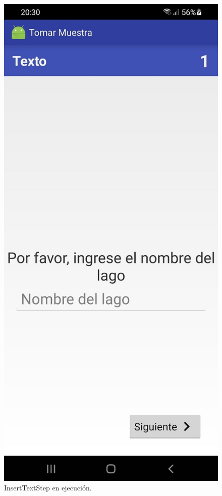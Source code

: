 \begin{figure}[H]
  \centering
    \includegraphics[scale=0.3]{50-anexos/C-steps/insert_text_screen.jpg} 
    \caption{InsertTextStep en ejecución.}
\end{figure}


